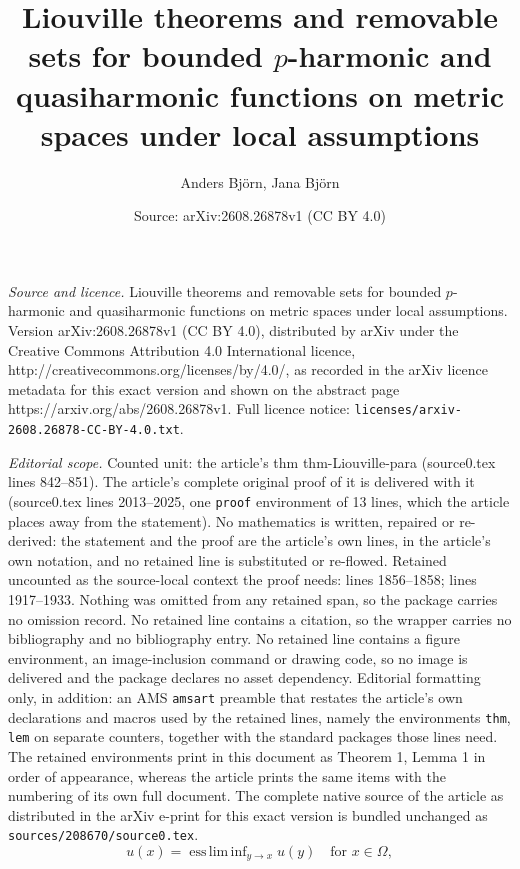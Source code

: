 \documentclass[10pt,a4paper]{amsart}
\title{Liouville theorems and removable sets for bounded $p$-harmonic and quasiharmonic functions on metric spaces under local assumptions}
\author{Anders Bj\"orn, Jana Bj\"orn}
\date{Source: arXiv:2608.26878v1 (CC BY 4.0)}
\newcommand{\Om}{\Omega}
\DeclareMathOperator*{\essliminf}{ess\,lim\,inf}
\begin{document}
\maketitle

\noindent\emph{Source and licence.} Liouville theorems and removable sets for bounded $p$-harmonic and quasiharmonic functions on metric spaces under local assumptions. Version arXiv:2608.26878v1 (CC BY 4.0), distributed by arXiv under the Creative Commons Attribution 4.0 International licence, http://creativecommons.org/licenses/by/4.0/, as recorded in the arXiv licence metadata for this exact version and shown on the abstract page https://arxiv.org/abs/2608.26878v1. Full licence notice: \texttt{licenses/arxiv-2608.26878-CC-BY-4.0.txt}.\par\smallskip

\noindent\textit{Editorial scope.} Counted unit: the article's thm thm-Liouville-para (source0.tex lines 842--851). The article's complete original proof of it is delivered with it (source0.tex lines 2013--2025, one \texttt{proof} environment of 13 lines, which the article places away from the statement). No mathematics is written, repaired or re-derived: the statement and the proof are the article's own lines, in the article's own notation, and no retained line is substituted or re-flowed.  Retained uncounted as the source-local context the proof needs: lines 1856--1858; lines 1917--1933.  Nothing was omitted from any retained span, so the package carries no omission record.  No retained line contains a citation, so the wrapper carries no bibliography and no bibliography entry.  No retained line contains a figure environment, an image-inclusion command or drawing code, so no image is delivered and the package declares no asset dependency.  Editorial formatting only, in addition: an AMS \texttt{amsart} preamble that restates the article's own declarations and macros used by the retained lines, namely the environments \texttt{thm}, \texttt{lem} on separate counters, together with the standard packages those lines need.  The retained environments print in this document as Theorem 1, Lemma 1 in order of appearance, whereas the article prints the same items with the numbering of its own full document.  The complete native source of the article as distributed in the arXiv e-print for this exact version is bundled unchanged as \texttt{sources/208670/source0.tex}.
\begin{equation} \label{eq-essliminf-reg}
u(x)=\essliminf_{y \to x} u(y) \quad \text{for } x \in \Om,
\end{equation}
\end{document}
